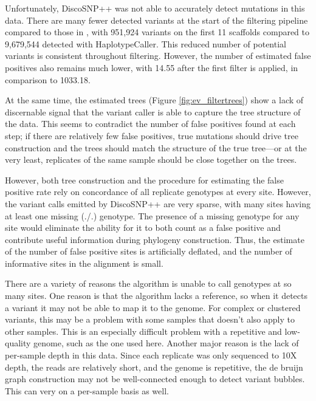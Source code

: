 Unfortunately, DiscoSNP++ was not able to accurately detect mutations in this data. There are many fewer detected variants at the start of the filtering pipeline compared to those in \cite{orr_phylogenomic_2020}, with 951,924 variants on the first 11 scaffolds compared to 9,679,544 detected with HaplotypeCaller. This reduced number of potential variants is consistent throughout filtering. However, the number of estimated false positives also remains much lower, with 14.55 after the first filter is applied, in comparison to 1033.18.

At the same time, the estimated trees (Figure \ref{fig:ev_filtertrees}) show a lack of discernable signal that the variant caller is able to capture the tree structure of the data. This seems to contradict the number of false positives found at each step; if there are relatively few false positives, true mutations should drive tree construction and the trees should match the structure of the true tree---or at the very least, replicates of the same sample should be close together on the trees.

However, both tree construction and the procedure for estimating the false positive rate rely on concordance of all replicate genotypes at every site. However, the variant calls emitted by DiscoSNP++ are very sparse, with many sites having at least one missing (./.) genotype. The presence of a missing genotype for any site would eliminate the ability for it to both count as a false positive and contribute useful information during phylogeny construction. Thus, the estimate of the number of false positive sites is artificially deflated, and the number of informative sites in the alignment is small. 


There are a variety of reasons the algorithm is unable to call genotypes at so many sites. One reason is that the algorithm lacks a reference, so when it detects a variant it may not be able to map it to the genome. For complex or clustered variants, this may be a problem with some samples that doesn't also apply to other samples. This is an especially difficult problem with a repetitive and low-quality genome, such as the one used here. Another major reason is the lack of per-sample depth in this data. Since each replicate was only sequenced to 10X depth, the reads are relatively short, and the genome is repetitive, the de bruijn graph construction may not be well-connected enough to detect variant bubbles. This can very on a per-sample basis as well.

